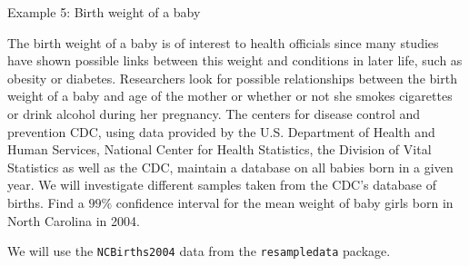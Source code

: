 \documentclass[
  ignorenonframetext,
]{beamer}
\begin{document}
\begin{frame}[fragile]{Example 5: Birth weight of a baby}
\protect\hypertarget{example-5-birth-weight-of-a-baby}{}
\begin{tcolorbox}
The birth weight of a baby is of interest to health officials since many studies have shown possible links between this weight and conditions in later life, such as obesity or diabetes. Researchers look for possible relationships between the birth weight of a baby and age of the mother or whether or not she smokes cigarettes or drink alcohol during her pregnancy. The centers for disease control and prevention CDC, using data provided by the U.S. Department of Health and Human Services, National Center for Health Statistics, the Division of Vital Statistics as well as the CDC, maintain a database on all babies born in a given year. We will investigate different samples taken from the CDC’s database of births. Find a $99\%$ confidence interval for the mean weight of baby girls born in North Carolina in 2004.
\end{tcolorbox}

We will use the \texttt{NCBirths2004} data from the
\texttt{resampledata} package.
\end{frame}
\end{document}
